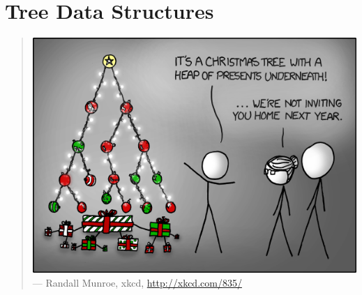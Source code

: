 
\chapter{Tree Data Structures}
\label{chap:tree_data_structures}

\begin{quote}
\footnotesize
\includegraphics[scale=0.7]{image/tree-data-structures/tree.png} \\
\noindent
--- Randall Munroe, xkcd,
\url{http://xkcd.com/835/}
\end{quote}

